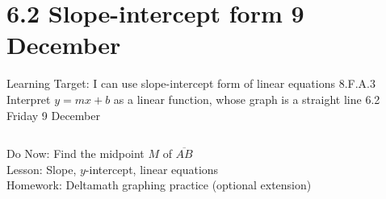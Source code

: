 \section{6.2 Slope-intercept form \hfill 9 December \,}
\begin{frame}{Learning Target: I can use slope-intercept form of linear equations}
  {8.F.A.3 Interpret $y=mx+b$ as a linear function, whose graph is a straight line \hfill \alert{6.2 Friday 9 December}}
  \begin{columns}
      Do Now: Find the midpoint $M$ of $\overline{AB}$ \\[1cm]
      Lesson: Slope, $y$-intercept, linear equations \\
      Homework: Deltamath graphing practice (optional extension)
    \begin{flushright}
    \end{flushright}
  \end{columns}
\end{frame}

